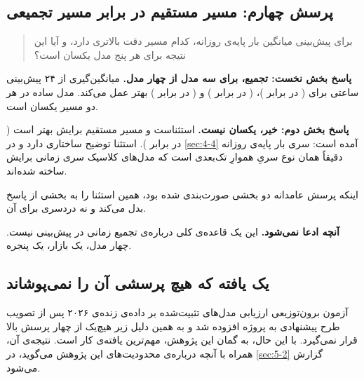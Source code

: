 \subsection*{پرسش چهارم: مسیر مستقیم در برابر مسیر تجمیعی}

\begin{quote}
برای پیش‌بینی میانگین بار پایه‌ی روزانه، کدام مسیر دقت بالاتری دارد، و
آیا این نتیجه برای هر پنج مدل یکسان است؟
\end{quote}

\textbf{پاسخ بخش نخست: تجمیع، برای سه مدل از چهار مدل.} میانگین‌گیری از ۲۴
پیش‌بینی ساعتی برای  ( در برابر )،
 ( در برابر ) و  ( در
برابر ) بهتر عمل می‌کند. مدل ساده در هر دو مسیر یکسان است.

\textbf{پاسخ بخش دوم: خیر، یکسان نیست.}  استثناست و مسیر مستقیم
برایش بهتر است ( در برابر ). استثنا توضیح ساختاری
دارد و در \cref{sec:4-4} آمده است: سری بار پایه‌ی روزانه دقیقاً همان نوع سریِ
هموارِ تک‌بعدی است که مدل‌های کلاسیک سری زمانی برایش ساخته شده‌اند.

اینکه پرسش عامدانه دو بخشی صورت‌بندی شده بود، همین استثنا را به بخشی از پاسخ
بدل می‌کند و نه دردسری برای آن.

\textbf{آنچه ادعا نمی‌شود.} این یک قاعده‌ی کلی درباره‌ی تجمیع زمانی در پیش‌بینی
نیست. چهار مدل، یک بازار، یک پنجره.

\subsection*{یک یافته که هیچ پرسشی آن را نمی‌پوشاند}

{
آزمون برون‌توزیعی  ارزیابی مدل‌های تثبیت‌شده بر داده‌ی زنده‌ی ۲۰۲۶
 پس از تصویب طرح پیشنهادی به پروژه افزوده شد و به همین دلیل زیر هیچ‌یک از
چهار پرسش بالا قرار نمی‌گیرد. با این حال، به گمان این پژوهش، مهم‌ترین یافته‌ی
کار است. نتیجه‌ی آن، همراه با آنچه درباره‌ی محدودیت‌های این پژوهش می‌گوید، در
\cref{sec:5-2} گزارش می‌شود.\par}
